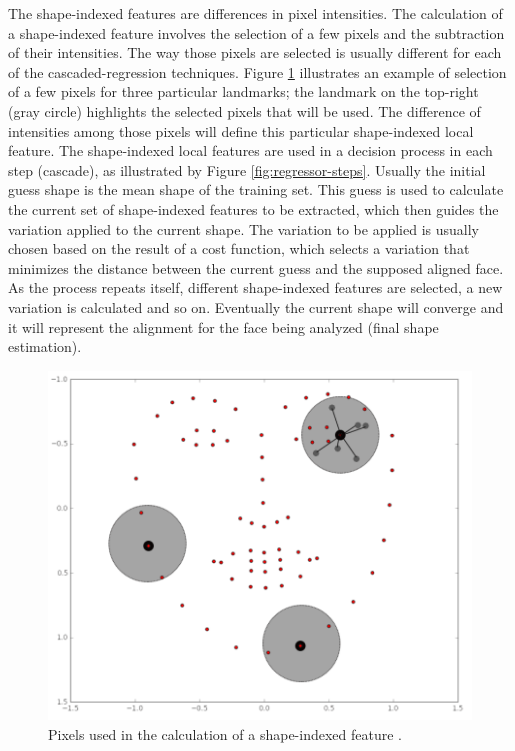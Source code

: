 The shape-indexed features are differences in pixel intensities. The calculation of a shape-indexed feature involves the selection of a few pixels and the subtraction of their intensities. The way those pixels are selected is usually different for each of the cascaded-regression techniques. Figure \ref{fig:shape-indexed} illustrates an example of selection of a few pixels for three particular landmarks; the landmark on the top-right (gray circle) highlights the selected pixels that will be used. The difference of intensities among those pixels will define this particular shape-indexed local feature. The shape-indexed local features are used in a decision process in each step (cascade), as illustrated by Figure \ref{fig:regressor-steps}. Usually the initial guess shape is the mean shape of the training set. This guess is used to calculate the current set of shape-indexed features to be extracted, which then guides the variation applied to the current shape. The variation to be applied is usually chosen based on the result of a cost function, which selects a variation that minimizes the distance between the current guess and the supposed aligned face. As the process repeats itself, different shape-indexed features are selected, a new variation is calculated and so on. Eventually the current shape will converge and it will represent the alignment for the face being analyzed (final shape estimation).

\begin{figure}[ht]
    \centering
    \includegraphics[width=0.7\linewidth]{figures/shape-indexed.png}
    \caption{Pixels used in the calculation of a shape-indexed feature \parencite{maris2015}.}
    \label{fig:shape-indexed}
\end{figure}

